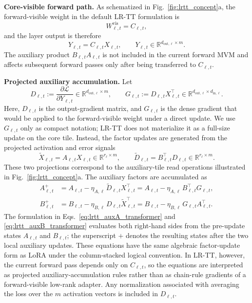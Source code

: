 \documentclass[fleqn,10pt]{wlscirep}
\begin{document}
\noindent\textbf{Core-visible forward path.}
As schematized in Fig.~\ref{fig:lrtt_concept}a, the forward-visible weight in the default LR-TT formulation is
\begin{equation}
W^{\mathrm{vis}}_{\ell,t}
=
C_{\ell,t},
\label{eq:lrtt_visible_weight}
\end{equation}
and the layer output is therefore
\begin{equation}
Y_{\ell,t}
=
C_{\ell,t}X_{\ell,t},
\qquad
Y_{\ell,t}
\in
\mathbb{R}^{d_{\mathrm{out},\ell}\times m}.
\label{eq:lrtt_layer_forward}
\end{equation}
The auxiliary product \(B_{\ell,t}A_{\ell,t}\) is not included in the current forward MVM and affects subsequent forward passes only after being transferred to \(C_{\ell,t}\).

\noindent\textbf{Projected auxiliary accumulation.}
Let
\begin{equation}
D_{\ell,t}
:=
\frac{\partial\mathcal{L}}{\partial Y_{\ell,t}}
\in
\mathbb{R}^{d_{\mathrm{out},\ell}\times m},
\qquad
G_{\ell,t}
:=
D_{\ell,t}X_{\ell,t}^{\top}
\in
\mathbb{R}^{d_{\mathrm{out},\ell}\times d_{\mathrm{in},\ell}}.
\label{eq:lrtt_layer_grad}
\end{equation}
Here, \(D_{\ell,t}\) is the output-gradient matrix, and \(G_{\ell,t}\) is the dense gradient that would be applied to the forward-visible weight under a direct update.
We use \(G_{\ell,t}\) only as compact notation; LR-TT does not materialize it as a full-size update on the core tile.
Instead, the factor updates are generated from the projected activation and error signals
\begin{equation}
\widetilde{X}_{\ell,t}
=
A_{\ell,t}X_{\ell,t}
\in
\mathbb{R}^{r_\ell\times m},
\qquad
\widetilde{D}_{\ell,t}
=
B_{\ell,t}^{\top}D_{\ell,t}
\in
\mathbb{R}^{r_\ell\times m}.
\label{eq:lrtt_projected_signals}
\end{equation}
These two projections correspond to the auxiliary-tile read operations illustrated in Fig.~\ref{fig:lrtt_concept}a.
The auxiliary factors are accumulated as
\begin{align}
A_{\ell,t}^{+}
&=
A_{\ell,t}
-
\eta_{A,\ell}\,
\widetilde{D}_{\ell,t}X_{\ell,t}^{\top}
=
A_{\ell,t}
-
\eta_{A,\ell}\,
B_{\ell,t}^{\top}G_{\ell,t},
\label{eq:lrtt_auxA_transformer}
\\
B_{\ell,t}^{+}
&=
B_{\ell,t}
-
\eta_{B,\ell}\,
D_{\ell,t}\widetilde{X}_{\ell,t}^{\top}
=
B_{\ell,t}
-
\eta_{B,\ell}\,
G_{\ell,t}A_{\ell,t}^{\top}.
\label{eq:lrtt_auxB_transformer}
\end{align}
The formulation in Eqs.~\eqref{eq:lrtt_auxA_transformer} and
\eqref{eq:lrtt_auxB_transformer}
evaluates both right-hand sides from the pre-update states
\(A_{\ell,t}\) and \(B_{\ell,t}\); the superscript \(+\) denotes the resulting states after the two local auxiliary updates.
These equations have the same algebraic factor-update form as LoRA under the column-stacked logical convention.
In LR-TT, however, the current forward pass depends only on \(C_{\ell,t}\), so the equations are interpreted as projected auxiliary-accumulation rules rather than as chain-rule gradients of a forward-visible low-rank adapter.
Any normalization associated with averaging the loss over the \(m\) activation vectors is included in \(D_{\ell,t}\).
\end{document}
